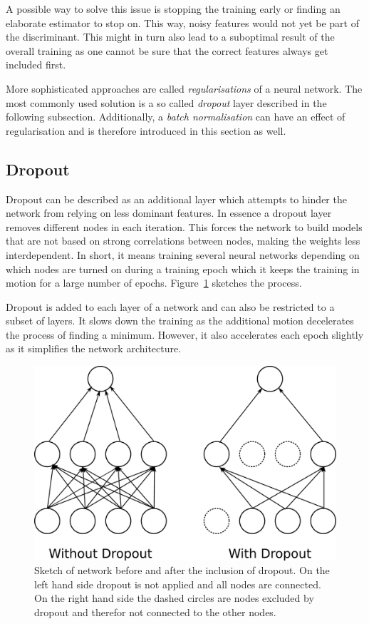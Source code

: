 A possible way to solve this issue is stopping the training early or finding an elaborate estimator to stop on. This way, noisy features would not yet be part of the discriminant. This might in turn also lead to a suboptimal result of the overall training as one cannot be sure that the correct features always get included first.

More sophisticated approaches are called \emph{regularisations} of a neural network. The most commonly used solution is a so called \emph{dropout} layer described in the following subsection. Additionally, a \emph{batch normalisation} can have an effect of regularisation and is therefore introduced in this section as well.

\subsection{Dropout}
\label{sec:dropout}

Dropout can be described as an additional layer which attempts to hinder the network from relying on less dominant features. In essence a dropout layer removes different nodes in each iteration. This forces the network to build models that are not based on strong correlations between nodes, making the weights less interdependent. In short, it means training several neural networks depending on which nodes are turned on during a training epoch which it keeps the training in motion for a large number of epochs. Figure~\ref{fig:dropout} sketches the process.

Dropout is added to each layer of a network and can also be restricted to a subset of layers. It slows down the training as the additional motion decelerates the process of finding a minimum. However, it also accelerates each epoch slightly as it simplifies the network architecture. 

\begin{figure}[htbp]
	\centering
	\includegraphics[scale = 0.1]{figures_ML/dropout.eps}
	\caption[Dropout Sketch]{Sketch of network before and after the inclusion of dropout. On the left hand side dropout is not applied and all nodes are connected. On the right hand side the dashed circles are nodes excluded by dropout and therefor not connected to the other nodes.}
	\label{fig:dropout}
\end{figure}



